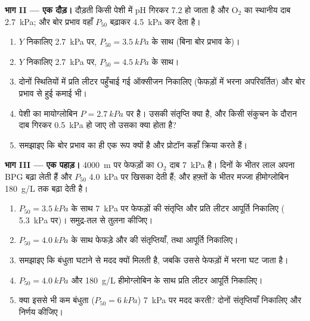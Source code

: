 \begin{problem}
\medskip
\noindent\textbf{भाग II --- एक दौड़।}
दौड़ती किसी पेशी में pH गिरकर 7.2 हो जाता है और $\mathrm{O_2}$ का
स्थानीय दाब \qty{2.7}{kPa}; और बोर प्रभाव वहाँ $P_{50}$ बढ़ाकर
\qty{4.5}{kPa} कर देता है।
\begin{enumerate}[resume]
  \item $Y$ निकालिए \qty{2.7}{kPa} पर, $P_{50} = \qty{3.5}{kPa}$
        के साथ (बिना बोर प्रभाव के)।
  \item $Y$ निकालिए \qty{2.7}{kPa} पर, $P_{50} = \qty{4.5}{kPa}$
        के साथ।
  \item दोनों स्थितियों में प्रति लीटर पहुँचाई गई ऑक्सीजन निकालिए
        (फेफड़ों में भरना अपरिवर्तित) और बोर प्रभाव से हुई कमाई भी।
  \item पेशी का मायोग्लोबिन $P = \qty{2.7}{kPa}$ पर है। उसकी संतृप्ति
        क्या है, और किसी संकुचन के दौरान दाब गिरकर
        \qty{0.5}{kPa} हो जाए तो उसका क्या होता है?
  \item समझाइए कि बोर प्रभाव  का ही एक रूप क्यों है और
        प्रोटॉन कहाँ क्रिया करते हैं।
\end{enumerate}

\medskip
\noindent\textbf{भाग III --- एक पहाड़।}
\qty{4000}{m} पर फेफड़ों का $\mathrm{O_2}$ दाब \qty{7}{kPa} है।
दिनों के भीतर लाल  अपना BPG बढ़ा लेती हैं और $P_{50}$
\qty{4.0}{kPa} पर खिसका देती हैं; और हफ़्तों के भीतर मज्जा हीमोग्लोबिन
\qty{180}{g/L} तक बढ़ा देती है।
\begin{enumerate}[resume]
  \item $P_{50} = \qty{3.5}{kPa}$ के साथ \qty{7}{kPa} पर फेफड़ों की
        संतृप्ति और प्रति लीटर आपूर्ति निकालिए (
        \qty{5.3}{kPa} पर)। समुद्र-तल से तुलना कीजिए।
  \item $P_{50} = \qty{4.0}{kPa}$ के साथ फेफड़े और  की संतृप्तियाँ,
        तथा आपूर्ति निकालिए।
  \item समझाइए कि बंधुता घटाने से मदद क्यों मिलती है, जबकि उससे
        फेफड़ों में भरना घट जाता है।
  \item $P_{50} = \qty{4.0}{kPa}$ और \qty{180}{g/L} हीमोग्लोबिन के साथ
        प्रति लीटर आपूर्ति निकालिए।
  \item क्या इससे भी कम बंधुता ($P_{50} = \qty{6}{kPa}$) \qty{7}{kPa}
        पर मदद करती? दोनों संतृप्तियाँ निकालिए और निर्णय कीजिए।
\end{enumerate}


\end{problem}
